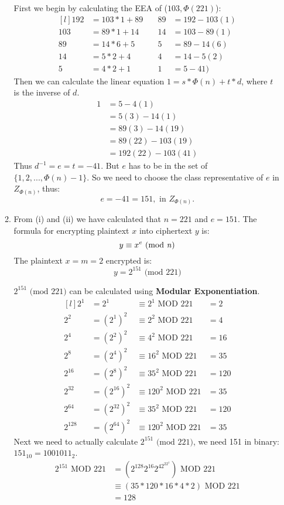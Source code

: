 \documentclass{article}
\begin{document}
\begin{enumerate}
\begin{enumerate}
			First we begin by calculating the EEA of ($103, \Phi(221)$):
			\[
			\begin{matrix*}[l]
				192&=103 * 1 + 89 & \quad89& = 192 -103(1)\\
				103&=89*1+14 &\quad 14&=103-89(1)\\
				89&=14*6+5 & \quad5 &= 89-14(6)\\
				14&=5*2+4 &\quad 4 &=14-5(2)\\
				5&=4 *2 +1 &\quad 1 &=5-41)
			\end{matrix*}
			\]
			Then we can calculate the linear equation $1 = s*\Phi(n) + t*d$, where $t$ is the inverse of $d$. 
			\[
			\begin{split}
				1&=5-4(1)\\
				&=5(3)-14(1)\\
				&=89(3)-14(19)\\
				&=89(22)-103(19)\\
				&=192(22)-103(41)
			\end{split}
			\] 
			Thus $d^{-1} = e = t = -41$. But $e$ has to be in the set of $\{1,2,...,\Phi(n)-1 \}$. So we need to choose the class representative of $e$ in $Z_{\Phi(n)}$, thus:
			$$
			e = -41 = 151, \text{ in } Z_{\Phi(n)}.
			$$
			

			\item From (i) and (ii) we have calculated that $n=221$ and $e=151$. The formula for encrypting plaintext $x$ into ciphertext $y$ is:
			$$
			y \equiv x^e \text{ (mod \textit{n})}
			$$ 
			The plaintext $x = m = 2$ encrypted is:
			$$
			y=2^{151} \text{ (mod 221)}
			$$
			
			$2^{151} \text{ (mod $221$)}$ can be calculated using \textbf{Modular Exponentiation}.
			\[
			\begin{matrix*}[l]
				2^1&=2^1&\equiv 2^1 \text{ MOD } 221 &=2\\
				2^{2}&=(2^{1})^{2}&\equiv 2^{2} \text{ MOD } 221 &=4\\
				2^{4}&=(2^{2})^{2}&\equiv 4^{2} \text{ MOD } 221 &=16\\
				2^{8}&=(2^{4})^{2}&\equiv 16^{2} \text{ MOD } 221 &=35\\
				2^{16}&=(2^{8})^{2}&\equiv 35^{2} \text{ MOD } 221 &=120\\
				2^{32}&=(2^{16})^{2}&\equiv 120^{2} \text{ MOD } 221 &=35\\
				2^{64}&=(2^{32})^{2}&\equiv 35^{2} \text{ MOD } 221 &=120\\
				2^{128}&=(2^{64})^{2}&\equiv 120^{2} \text{ MOD } 221 &=35
			\end{matrix*}
			\]
			Next we need to actually calculate $2^{151} \text{ (mod $221$)}$, we need 151 in binary: $151_{10} = 1001011_2$.
			\[
			\begin{split}
				2^{151} \text{ MOD } 221 &= (2^{128}2^{16}2^42^22^1) \text{ MOD } 221\\
				&\equiv (35*120*16*4*2) \text{ MOD } 221 \\
				&= 128
			\end{split}
			\]
			

\end{enumerate}
\end{enumerate}
\end{document}
